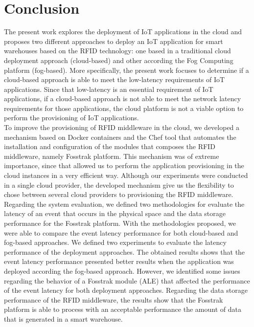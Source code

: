 
\chapter{Conclusion}
\label{chapter:conclusion}
The present work explores the deployment of \gls{IoT} applications in the cloud and proposes
two different approaches to deploy an \gls{IoT} application for smart warehouses based on the
\gls{RFID} technology: one based in a traditional cloud deployment approach (cloud-based) and other
according the Fog Computing platform (fog-based). More specifically, the present work focuses to
determine if a cloud-based approach is able to meet the low-latency requirements of \gls{IoT}
applications. Since that low-latency is an essential requirement of \gls{IoT} applications, if a
cloud-based approach is not able to meet the network latency requirements for those applications,
the cloud platform is not a viable option to perform the provisioning of \gls{IoT} applications.\\

To improve the provisioning of \gls{RFID} middleware in the cloud, we developed a mechanism based on
Docker containers and the Chef tool that automates the installation and configuration of the modules
that composes the \gls{RFID} middleware, namely Fosstrak platform. This mechanism was of extreme
importance, since that allowed us to perform the application provisioning in the cloud instances in
a very efficient way. Although our experiments were conducted in a single cloud provider, the developed
mechanism give us the flexibility to chose between several cloud providers to provisioning the \gls{RFID} middleware.\\

Regarding the system evaluation, we defined two methodologies for evaluate the latency of an event that
occurs in the physical space and the data storage performance for the Fosstrak platform. With the
methodologies proposed, we were able to compare the event latency performance for both cloud-based
and fog-based approaches. We defined two experiments to evaluate the latency performance of the
deployment approaches. The obtained results shows that the event latency performance presented better
results when the application was deployed according the fog-based approach. However, we identified
some issues regarding the behavior of a Fosstrak module (\gls{ALE}) that affected the performance
of the event latency for both deployment approaches. Regarding the data storage performance of the
RFID middleware, the results show that the Fosstrak platform is able to process with an acceptable
performance the amount of data that is generated in a smart warehouse.

